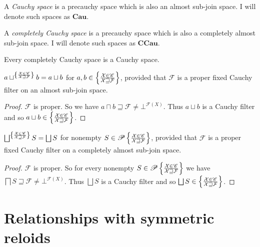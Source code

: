 \begin{defn}
A \emph{Cauchy space} is a precauchy space which is also an almost sub-join space.
I will denote such spaces as $\mathbf{Cau}$.
\end{defn}

\begin{defn}
  A \emph{completely Cauchy space} is a precauchy space which is also a completely almost sub-join space.
I will denote such spaces as $\mathbf{CCau}$.
\end{defn}

\begin{obvious}
Every completely Cauchy space is a Cauchy space.
\end{obvious}

\begin{prop}
  $a\sqcup^{
    \left\{ \frac{\mathcal{X} \in \mathscr{C} }{\mathcal{X} \sqsupseteq \mathcal{F}}\right\}
  } b = a\sqcup b$ for
  $a,b \in \left\{ \frac{\mathcal{X} \in \mathscr{C} }{\mathcal{X} \sqsupseteq \mathcal{F}}\right\}$,
  provided that $\mathcal{F}$ is a proper fixed Cauchy filter on an almost sub-join space.
\end{prop}

\begin{proof}
  $\mathcal{F}$ is proper. So
  we have $a \sqcap b \sqsupseteq \mathcal{F} \neq \bot^{\mathscr{F} (X)}$. Thus $a\sqcup b$ is a Cauchy
  filter and so $a\sqcup b \in \left\{ \frac{\mathcal{X} \in \mathscr{C} }{\mathcal{X} \sqsupseteq \mathcal{F}}\right\}$.
\end{proof}

\begin{prop}
  $\bigsqcup^{
    \setcond{\mathcal{X} \in \mathscr{C} }{\mathcal{X} \sqsupseteq \mathcal{F}}
  } S = \bigsqcup S$ for nonempty
  $S \in \mathscr{P} \left\{ \frac{\mathcal{X} \in \mathscr{C} }{\mathcal{X} \sqsupseteq \mathcal{F}}\right\}$,
  provided that $\mathcal{F}$ is a proper fixed Cauchy filter on a  completely almost sub-join space.
\end{prop}

\begin{proof}
  $\mathcal{F}$ is proper. So for every nonempty $S \in \mathscr{P}
  \left\{ \frac{\mathcal{X} \in \mathscr{C} }{\mathcal{X} \sqsupseteq \mathcal{F}}\right\}$
  we have $\bigsqcap S \sqsupseteq \mathcal{F} \neq \bot^{\mathscr{F} (X)}$. Thus $\bigsqcup S$ is a Cauchy
  filter and so $\bigsqcup S \in \setcond{\mathcal{X} \in \mathscr{C} }{\mathcal{X} \sqsupseteq \mathcal{F}}$.
\end{proof}

\section{Relationships with symmetric reloids}

